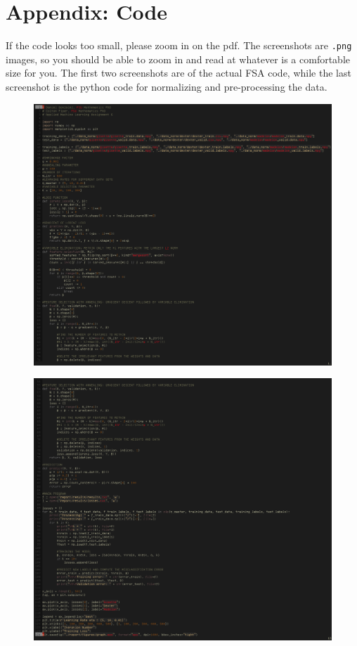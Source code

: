 \documentclass[UTF8]{article}
\begin{document}
\section{Appendix: Code}
If the code looks too small, please zoom in on the pdf.
The screenshots are \texttt{.png} images, so you should be able to zoom in and read at whatever is a comfortable size for you.
The first two screenshots are of the actual FSA code, while the last screenshot is the python code for normalizing and pre-processing the data.
\begin{figure}[H]
    \centering
    \includegraphics[scale=0.6]{./figures/code1.png}
\end{figure}
\begin{figure}[H]
    \centering
    \includegraphics[scale=0.6]{./figures/code2.png}
\end{figure}
\end{document}
